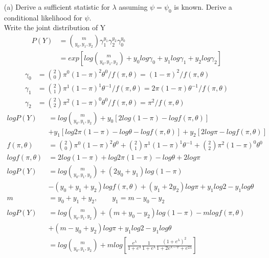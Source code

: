 \documentclass[11pt]{article} %
\begin{document}
\begin{itemize}
	\item [(a)] Derive a sufficient statistic for $\lambda$ assuming  $\psi = \psi_0$ is known. Derive a conditional
	likelihood for $\psi$.\\
	Write the joint distribution of Y
	\begin{align*}
		P(Y) &= {m \choose y_0, y_1, y_2}  \gamma_1^{y_1} \gamma_2^{y_2} \gamma_0^{y_0} \\
		&= exp \left[ log {m \choose y_0, y_1, y_2} + y_0 log \gamma_0 + y_1 log\gamma_1 + y_2 log \gamma_2 \right]
	\end{align*}    
	\begin{align*}
		\gamma_0 &= {2 \choose 0} \pi^0 (1-\pi)^{2} \theta^{0} /f(\pi, \theta)= (1-\pi)^2/f(\pi, \theta)\\
		\gamma_1 &= {2 \choose 1} \pi^1 (1-\pi)^{1} \theta^{-1} /f(\pi, \theta)= 2\pi (1-\pi) \theta^{-1}/f(\pi, \theta)\\
		\gamma_2 &= {2 \choose 2} \pi^2 (1-\pi)^{0} \theta^{0} /f(\pi, \theta)= \pi^2/f(\pi, \theta)
	\end{align*} 
	\begin{align*}
		log P(Y) &=  log {m \choose y_0, y_1, y_2} + y_0 [2log (1-\pi) - log f(\pi,\theta)] \\
		& + y_1 [log 2 \pi (1-\pi) - log \theta - log f(\pi,\theta)]+ y_2 [2 log \pi - log f(\pi, \theta) ]\\
		f(\pi, \theta) &= {2 \choose 0} \pi^0 (1-\pi)^{2} \theta^{0} + {2 \choose 1} \pi^1 (1-\pi)^{1} \theta^{-1} + {2 \choose 2} \pi^2 (1-\pi)^{0} \theta^{0}\\
		log f(\pi, \theta) &=2log (1-\pi) +log 2 \pi (1-\pi) - log \theta + 2 log \pi \\
		log P(Y) &= log {m \choose y_0, y_1, y_2} + (2y_0 + y_1) log(1-\pi) \\
		& - (y_0+y_1+y_2) log f(\pi, \theta) + (y_1+ 2y_2) log \pi + y_1 log2 - y_1 log \theta\\
		m &= y_0 + y_1 + y_2, \qquad y_1 = m- y_0 - y_2\\
		log P(Y) &= log {m \choose y_0, y_1, y_2} + (m + y_0 - y_2) log(1-\pi) - mlog f(\pi, \theta)\\
		&+ (m-y_0+y_2)log \pi + y_1 log2 - y_1 log \theta\\
		&= log {m \choose y_0, y_1, y_2} + m log\left[ \frac{e^{\lambda}}{1+e^{\lambda}}  \frac{1}{1+e^{\lambda}} \frac{(1+e^{\lambda})^2}{1+ 2e^{\lambda-\psi} + e^{2\lambda}} \right] \\

\end{align*}
\end{itemize}
\end{document}
